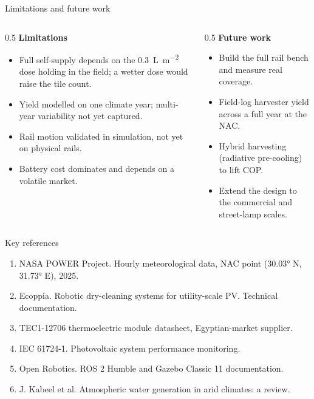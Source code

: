 \documentclass[aspectratio=169,10pt]{beamer}
\begin{document}
\begin{frame}{Limitations and future work}
  \begin{columns}[T]
    \begin{column}{0.5\textwidth}
      \textbf{Limitations}
      \begin{itemize}\small\setlength\itemsep{0.35em}
        \item Full self-supply depends on the \SI{0.3}{\liter\per\square\meter} dose holding in the field; a wetter dose would raise the tile count.
        \item Yield modelled on one climate year; multi-year variability not yet captured.
        \item Rail motion validated in simulation, not yet on physical rails.
        \item Battery cost dominates and depends on a volatile market.
      \end{itemize}
    \end{column}
    \begin{column}{0.5\textwidth}
      \textbf{Future work}
      \begin{itemize}\small\setlength\itemsep{0.35em}
        \item Build the full rail bench and measure real coverage.
        \item Field-log harvester yield across a full year at the NAC.
        \item Hybrid harvesting (radiative pre-cooling) to lift COP.
        \item Extend the design to the commercial and street-lamp scales.
      \end{itemize}
    \end{column}
  \end{columns}
\end{frame}

\begin{frame}{Key references}
  \footnotesize
  \begin{enumerate}\setlength\itemsep{0.4em}
    \item NASA POWER Project. Hourly meteorological data, NAC point (\ang{30.03} N, \ang{31.73} E), 2025.
    \item Ecoppia. Robotic dry-cleaning systems for utility-scale PV. Technical documentation.
    \item TEC1-12706 thermoelectric module datasheet, Egyptian-market supplier.
    \item IEC 61724-1. Photovoltaic system performance monitoring.
    \item Open Robotics. ROS 2 Humble and Gazebo Classic 11 documentation.
    \item J. Kabeel et al. Atmospheric water generation in arid climates: a review.
  \end{enumerate}
\end{frame}
\end{document}
